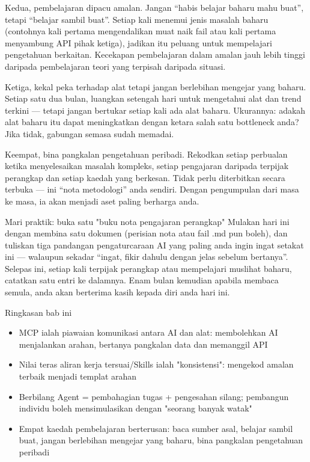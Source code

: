 Kedua, pembelajaran dipacu amalan. Jangan “habis belajar baharu mahu buat”, tetapi “belajar sambil buat”. Setiap kali menemui jenis masalah baharu (contohnya kali pertama mengendalikan muat naik fail atau kali pertama menyambung API pihak ketiga), jadikan itu peluang untuk mempelajari pengetahuan berkaitan. Kecekapan pembelajaran dalam amalan jauh lebih tinggi daripada pembelajaran teori yang terpisah daripada situasi.

Ketiga, kekal peka terhadap alat tetapi jangan berlebihan mengejar yang baharu. Setiap satu dua bulan, luangkan setengah hari untuk mengetahui alat dan trend terkini — tetapi jangan bertukar setiap kali ada alat baharu. Ukurannya: adakah alat baharu itu dapat meningkatkan dengan ketara salah satu bottleneck anda? Jika tidak, gabungan semasa sudah memadai.

Keempat, bina pangkalan pengetahuan peribadi. Rekodkan setiap perbualan ketika menyelesaikan masalah kompleks, setiap pengajaran daripada terpijak perangkap dan setiap kaedah yang berkesan. Tidak perlu diterbitkan secara terbuka — ini “nota metodologi” anda sendiri. Dengan pengumpulan dari masa ke masa, ia akan menjadi aset paling berharga anda.

\begin{tcbpractice}{Mari praktik: buka satu "buku nota pengajaran perangkap"}
Mulakan hari ini dengan membina satu dokumen (perisian nota atau fail .md pun boleh), dan tuliskan tiga pandangan pengaturcaraan AI yang paling anda ingin ingat setakat ini — walaupun sekadar “ingat, fikir dahulu dengan jelas sebelum bertanya”. Selepas ini, setiap kali terpijak perangkap atau mempelajari muslihat baharu, catatkan satu entri ke dalamnya. Enam bulan kemudian apabila membaca semula, anda akan berterima kasih kepada diri anda hari ini.

\end{tcbpractice}

\begin{tcbsummary}{Ringkasan bab ini}
\begin{itemize}
  \item MCP ialah piawaian komunikasi antara AI dan alat: membolehkan AI menjalankan arahan, bertanya pangkalan data dan memanggil API
  \item Nilai teras aliran kerja tersuai/Skills ialah "konsistensi": mengekod amalan terbaik menjadi templat arahan
  \item Berbilang Agent = pembahagian tugas + pengesahan silang; pembangun individu boleh mensimulasikan dengan "seorang banyak watak"
  \item Empat kaedah pembelajaran berterusan: baca sumber asal, belajar sambil buat, jangan berlebihan mengejar yang baharu, bina pangkalan pengetahuan peribadi
\end{itemize}

\end{tcbsummary}
